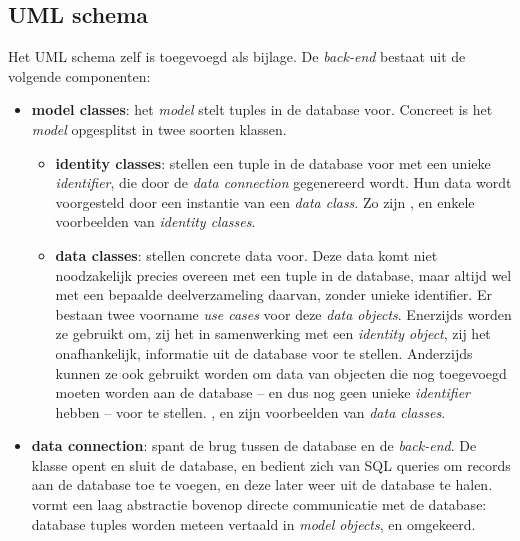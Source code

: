 \documentclass[12pt,a4paper]{article}
\begin{document}
\subsection{UML schema}

Het UML schema zelf is toegevoegd als bijlage. De \emph{back-end} bestaat uit de volgende componenten:

\begin{itemize}

\item \textbf{model classes}: het \emph{model} stelt tuples in de database voor. Concreet is het \emph{model} opgesplitst in twee soorten klassen.

\begin{itemize}

\item \textbf{identity classes}: stellen een tuple in de database voor met een unieke \emph{identifier}, die door de \emph{data connection} gegenereerd wordt. Hun data wordt voorgesteld door een instantie van een \emph{data class}. Zo zijn ,  en  enkele voorbeelden van \emph{identity classes}.

\item \textbf{data classes}: stellen concrete data voor. Deze data komt niet noodzakelijk precies overeen met een tuple in de database, maar altijd wel met een bepaalde deelverzameling daarvan, zonder unieke identifier. Er bestaan twee voorname \emph{use cases} voor deze \emph{data objects}. Enerzijds worden ze gebruikt om, zij het in samenwerking met een \emph{identity object}, zij het onafhankelijk, informatie uit de database voor te stellen. Anderzijds kunnen ze ook gebruikt worden om data van objecten die nog toegevoegd moeten worden aan de database -- en dus nog geen unieke \emph{identifier} hebben -- voor te stellen. ,  en  zijn voorbeelden van \emph{data classes}.

\end{itemize}

\item \textbf{data connection}: spant de brug tussen de database en de \emph{back-end}. De  klasse opent en sluit de database, en bedient zich van SQL queries om records aan de database toe te voegen, en deze later weer uit de database te halen.  vormt een laag abstractie bovenop directe communicatie met de database: database tuples worden meteen vertaald in \emph{model objects}, en omgekeerd.


\end{itemize}
\end{document}
